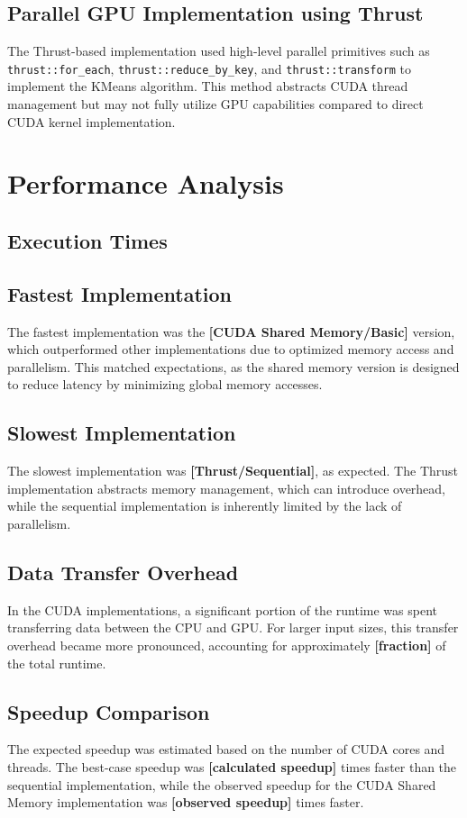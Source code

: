 \documentclass[letterpaper,12pt]{article}
\theoremstyle{remark}
\begin{document}
\subsection{Parallel GPU Implementation using Thrust}
The Thrust-based implementation used high-level parallel primitives such as \texttt{thrust::for\_each}, \texttt{thrust::reduce\_by\_key}, and \texttt{thrust::transform} to implement the KMeans algorithm. This method abstracts CUDA thread management but may not fully utilize GPU capabilities compared to direct CUDA kernel implementation.

\section{Performance Analysis}

\subsection{Execution Times}


\subsection{Fastest Implementation}
The fastest implementation was the \textbf{[CUDA Shared Memory/Basic]} version, which outperformed other implementations due to optimized memory access and parallelism. This matched expectations, as the shared memory version is designed to reduce latency by minimizing global memory accesses.

\subsection{Slowest Implementation}
The slowest implementation was \textbf{[Thrust/Sequential]}, as expected. The Thrust implementation abstracts memory management, which can introduce overhead, while the sequential implementation is inherently limited by the lack of parallelism.

\subsection{Data Transfer Overhead}
In the CUDA implementations, a significant portion of the runtime was spent transferring data between the CPU and GPU. For larger input sizes, this transfer overhead became more pronounced, accounting for approximately \textbf{[fraction]} of the total runtime.

\subsection{Speedup Comparison}
The expected speedup was estimated based on the number of CUDA cores and threads. The best-case speedup was \textbf{[calculated speedup]} times faster than the sequential implementation, while the observed speedup for the CUDA Shared Memory implementation was \textbf{[observed speedup]} times faster.
\end{document}
